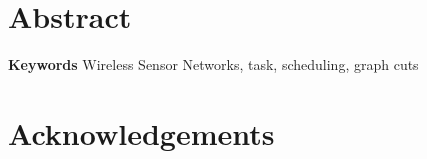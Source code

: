 \chapter*{Abstract}

 

\textbf{Keywords} Wireless Sensor Networks, task, scheduling, graph cuts

\chapter*{Acknowledgements}

 



